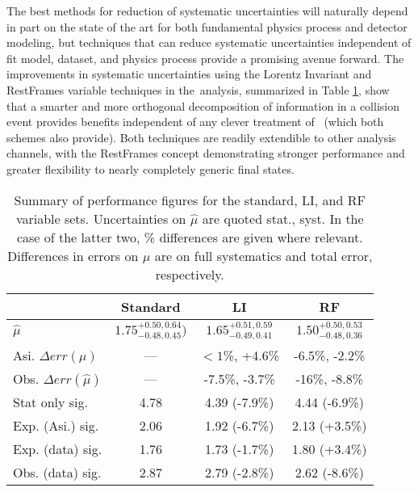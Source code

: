 The best methods for reduction of systematic uncertainties will naturally depend in part on the state of the art for both fundamental physics process and detector modeling, but techniques that can reduce systematic uncertainties independent of fit model, dataset, and physics process provide a promising avenue forward.  The improvements in systematic uncertainties using the Lorentz Invariant and RestFrames variable techniques in the \ZH\,analysis, summarized in Table \ref{tab:kahuna2}, show that a smarter and more orthogonal decomposition of information in a collision event provides benefits independent of any clever treatment of \met\, (which both schemes also provide).  Both techniques are readily extendible to other analysis channels, with the RestFrames concept demonstrating stronger performance and greater flexibility to nearly completely generic final states.

\begin{table}[!htbp]\captionsetup{justification=centering}
\begin{center}
\begin{tabular}{lccc}
\hline\hline
 & Standard &LI &RF\\
\hline
$\hat{\mu}$ & $1.75^{+0.50,0.64}_{-0.48,0.45})$ & $1.65^{+0.51,0.59}_{-0.49,0.41}$ & $1.50^{+0.50,0.53}_{-0.48,0.36}$\\
Asi. $\Delta err\left(\mu\right)$ &  --- & $<1$\%, +4.6\% & -6.5\%, -2.2\%\\
Obs. $\Delta err\left(\hat{\mu}\right)$ &  --- & -7.5\%, -3.7\% & -16\%, -8.8\%\\
\hline
Stat only sig. & 4.78 & 4.39 (-7.9\%) & 4.44 (-6.9\%)\\
Exp. (Asi.) sig. & 2.06 & 1.92 (-6.7\%) & 2.13 (+3.5\%)\\
Exp. (data) sig. & 1.76 & 1.73 (-1.7\%) & 1.80 (+3.4\%)\\
Obs. (data) sig. & 2.87 & 2.79 (-2.8\%) & 2.62 (-8.6\%)\\
\hline\hline
\end{tabular}
\end{center}
\caption{Summary of performance figures for the standard, LI, and RF variable sets.  Uncertainties on $\hat{\mu}$ are quoted stat., syst.  In the case of the latter two, \% differences are given where relevant.  Differences in errors on $\mu$ are on full systematics and total error, respectively.}
\label{tab:kahuna2}
\end{table}

